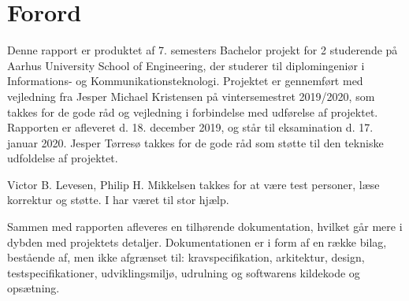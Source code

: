 \chapter{Forord}

Denne rapport er produktet af 7. semesters Bachelor projekt for 2 studerende på Aarhus University School of Engineering, der studerer til diplomingeniør i Informations- og Kommunikationsteknologi. Projektet er gennemført med vejledning fra Jesper Michael Kristensen på vintersemestret 2019/2020, som takkes for de gode råd og vejledning i forbindelse med udførelse af projektet. Rapporten er afleveret d. 18. december 2019, og står til eksamination d. 17. januar 2020. Jesper Tørresø takkes for de gode råd som støtte til den tekniske udfoldelse af projektet. 

Victor B. Levesen, Philip H. Mikkelsen takkes for at være test personer, læse korrektur og støtte. I har været til stor hjælp.

Sammen med rapporten afleveres en tilhørende dokumentation, hvilket går mere i dybden med projektets detaljer. Dokumentationen er i form af en række bilag, bestående af, men ikke afgrænset til: kravspecifikation, arkitektur, design, testspecifikationer, udviklingsmiljø, udrulning og softwarens kildekode og opsætning.